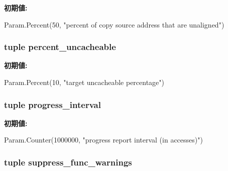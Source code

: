 \label{classMemTest_1_1MemTest_a143c80dade2755876d9bf20c20f98a9e}
{\bfseries 初期値:}
\begin{DoxyCode}
Param.Percent(50,
        "percent of copy source address that are unaligned")
\end{DoxyCode}
\hypertarget{classMemTest_1_1MemTest_ab7e138795f276619ab01efe41b5e167c}{
\subsubsection[{percent\_\-uncacheable}]{\setlength{\rightskip}{0pt plus 5cm}tuple {\bf percent\_\-uncacheable}}}
\label{classMemTest_1_1MemTest_ab7e138795f276619ab01efe41b5e167c}
{\bfseries 初期値:}
\begin{DoxyCode}
Param.Percent(10,
        "target uncacheable percentage")
\end{DoxyCode}
\hypertarget{classMemTest_1_1MemTest_a1446cbc3c813038b4583bfa7ee8cab43}{
\subsubsection[{progress\_\-interval}]{\setlength{\rightskip}{0pt plus 5cm}tuple {\bf progress\_\-interval}}}
\label{classMemTest_1_1MemTest_a1446cbc3c813038b4583bfa7ee8cab43}
{\bfseries 初期値:}
\begin{DoxyCode}
Param.Counter(1000000,
        "progress report interval (in accesses)")
\end{DoxyCode}
\hypertarget{classMemTest_1_1MemTest_a557248044ce243b3a309dbc63e306990}{
\subsubsection[{suppress\_\-func\_\-warnings}]{\setlength{\rightskip}{0pt plus 5cm}tuple {\bf suppress\_\-func\_\-warnings}}}
